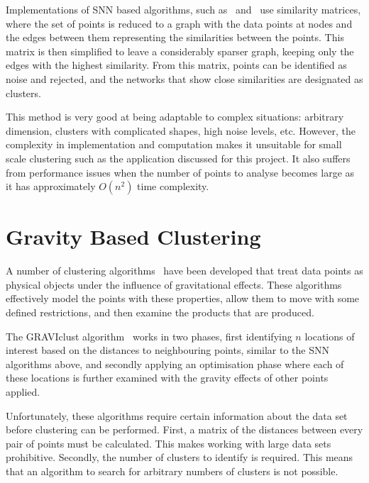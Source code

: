 Implementations of SNN based algorithms, such as~\cite{jarvis1973clustering}
and~\cite{ertoz2002new} use similarity matrices, where the set of points is
reduced to a graph with the data points at nodes and the edges between them
representing the similarities between the points. This matrix is then
simplified to leave a considerably sparser graph, keeping only the edges with
the highest similarity. From this matrix, points can be identified as noise and
rejected, and the networks that show close similarities are designated as
clusters.

This method is very good at being adaptable to complex situations: arbitrary
dimension, clusters with complicated shapes, high noise levels, etc. However,
the complexity in implementation and computation makes it unsuitable for small
scale clustering such as the application discussed for this project. It also
suffers from performance issues when the number of points to analyse becomes
large as it has approximately $O(n^2)$ time complexity.

\section{Gravity Based Clustering}
\label{sub:gravity_based_clustering}

A number of clustering algorithms~\cite{zhong2010novel} have been developed
that treat data points as physical objects under the influence of gravitational
effects. These algorithms effectively model the points with these properties,
allow them to move with some defined restrictions, and then examine the
products that are produced.

The GRAVIclust algorithm~\cite{indulska2002gravity} works in two phases, first
identifying $n$ locations of interest based on the distances to neighbouring
points, similar to the SNN algorithms above, and secondly applying an
optimisation phase where each of these locations is further examined with the
gravity effects of other points applied.

Unfortunately, these algorithms require certain information about the data set
before clustering can be performed. First, a matrix of the distances between
every pair of points must be calculated. This makes working with large data
sets prohibitive. Secondly, the number of clusters to identify is required.
This means that an algorithm to search for arbitrary numbers of clusters is not
possible.
